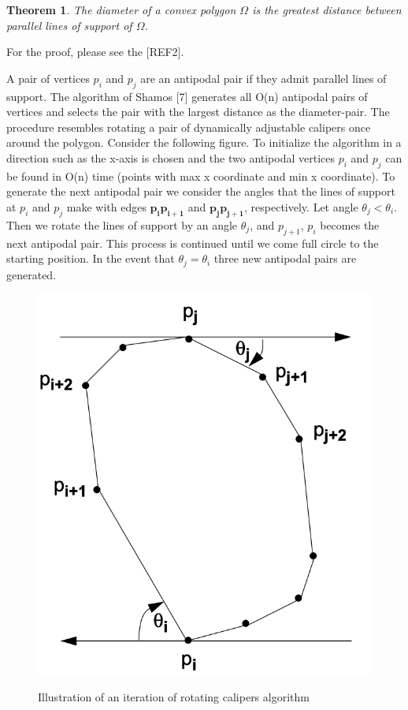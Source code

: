 \documentclass[12pt]{article}
\newtheorem{thm}{Theorem}[section]
\begin{document}
\begin{thm}
The diameter of a convex polygon $\Omega$ is the greatest distance between 
parallel lines of support of $\Omega$.
\end{thm}

For the proof, please see the [REF2].

A pair of vertices $p_i$ and $p_j$ are an antipodal pair if they admit parallel lines of support. The algorithm of Shamos [7] generates all O(n) antipodal pairs of vertices and selects the pair with the largest distance as the diameter-pair. The procedure resembles rotating 
a pair of dynamically adjustable calipers once around the polygon. 
Consider the following figure. 
To initialize the algorithm in a direction such as the x-axis is chosen and the 
two antipodal vertices $p_i$ and $p_j$ can be found in O(n) time 
(points with max x coordinate and min x coordinate).
To generate the next antipodal pair we consider the angles that the lines 
of support at $p_i$ and $p_j$ make with edges $\pmb{p_ip_{i+1}}$ and $\pmb{p_jp_{j+1}}$, respectively. 
Let angle $\theta_j < \theta_i$. Then we rotate the lines of support by an angle $\theta_j$, 
and $p_{j+1}$, $p_i$ becomes the next antipodal pair. This process is continued until
we come full circle to the starting position. 
In the event that $\theta_j = \theta_i$ three new antipodal pairs are generated.

\begin{center}
  \begin{figure}[!htb]
    \centering
    \includegraphics[width=.5\linewidth]{figures/fig17.png}
    \label{fig:18}
    \caption{Illustration of an iteration of rotating calipers algorithm}
  \end{figure}
\end{center}
\end{document}
